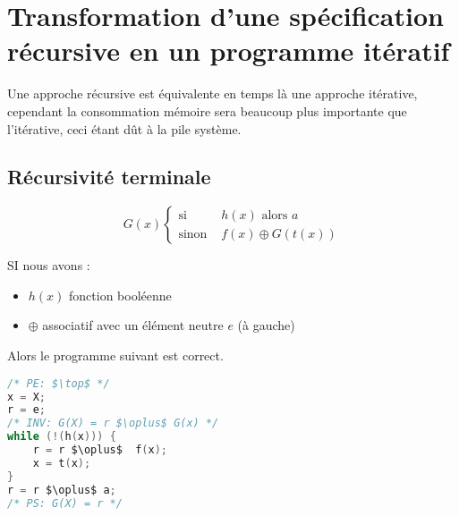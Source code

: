 \chapter{Transformation d'une spécification récursive en un programme itératif}
	Une approche récursive est équivalente en temps là une approche itérative, cependant la consommation mémoire sera beaucoup plus importante que
l'itérative, ceci étant dût à la pile système.

\section{Récursivité terminale}
	\begin{displaymath}
		G(x)
		\left\{ \begin{array}{ll}
			\textrm{si }&h(x)\textrm{ alors } a\\
			\textrm{sinon }&f(x) \oplus G(t(x)) 
		\end{array} \right.
	\end{displaymath}

	SI nous avons : 
	\begin{itemize}
		\item $h(x)$ fonction booléenne
		\item $\oplus$ associatif avec un élément neutre $e$ (à gauche)
	\end{itemize}
	Alors le programme suivant est correct.

\begin{lstlisting}[language=C]
/* PE: $\top$ */
x = X;
r = e;
/* INV: G(X) = r $\oplus$ G(x) */
while (!(h(x))) {
	r = r $\oplus$  f(x);
	x = t(x);
}
r = r $\oplus$ a;
/* PS: G(X) = r */
\end{lstlisting}

